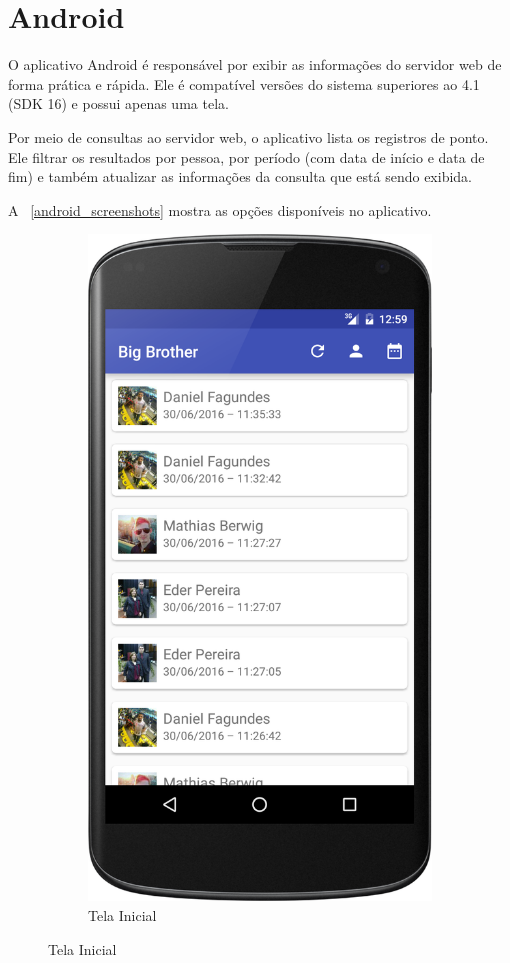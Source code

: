 \section{Android}

O aplicativo Android é responsável por exibir as informações do servidor web de forma prática e rápida. Ele é compatível versões do sistema superiores ao 4.1 (SDK 16) e possui apenas uma tela. 

Por meio de consultas ao servidor web, o aplicativo lista os registros de ponto. Ele  filtrar os resultados por pessoa, por período (com data de início e data de fim) e também atualizar as informações da consulta que está sendo exibida.

A ~\ref{android_screenshots} mostra as opções disponíveis no aplicativo.

\begin{figure}
\centering
\begin{subfigure}{.5\textwidth}
	\centering
	\caption{Tela Inicial}
	\includegraphics[scale=0.2]{imagens/android_tela_inicial.png}

\end{subfigure}
\end{figure}
